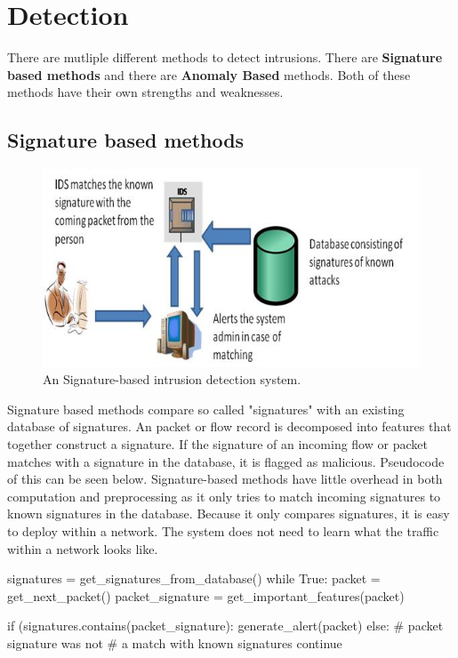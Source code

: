 \section{Detection}
\label{detection}
There are mutliple different methods to detect intrusions. There are \textbf{Signature based methods} and there are \textbf{Anomaly Based} methods. Both of these methods have their own strengths and weaknesses. 
\subsection{Signature based methods}
\begin{figure}[H]
\centering
\includegraphics[width=1\textwidth]{Figures/Signature-based-Intrusion-Detection-System}
\decoRule
\caption[Signature based IDS]{An Signature-based intrusion detection system. \cite{snortImg}}
\label{fig:Signature}
\end{figure}
\noindent Signature based methods compare so called "signatures" with an existing database of signatures. An packet or flow record is decomposed into features that together construct a signature. If the signature of an incoming flow or packet matches with a signature in the database, it is flagged as malicious. Pseudocode of this can be seen below. Signature-based methods have little overhead in both computation and preprocessing as it only tries to match incoming signatures to known signatures in the database. Because it only compares signatures, it is easy to deploy within a network. The system does not need to learn what the traffic within a network looks like. \cite{methods} \\
\begin{python}
signatures = get_signatures_from_database()
while True:
    packet = get_next_packet()
    packet_signature = get_important_features(packet)
    
    if (signatures.contains(packet_signature):
        generate_alert(packet)
    else:
         # packet signature was not
         # a match with known signatures
         continue
\end{python}~\\
